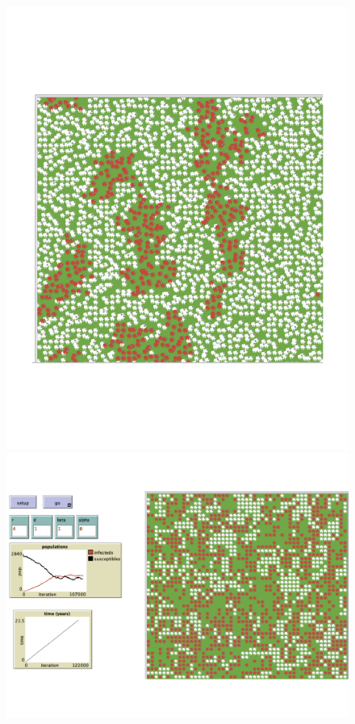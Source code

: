\documentclass[11pt, oneside]{article}   	%
\begin{document}
\begin{figure}
\centering
\begin{minipage}{.5\textwidth}
  \centering
  \includegraphics[width=1.1\linewidth]{NetlogoBeta4}
\end{minipage}%
\begin{minipage}{.5\textwidth}
  \centering
  \includegraphics[width=.95\linewidth]{NetlogoBeta1}

\end{minipage}
\end{figure}
\end{document}

